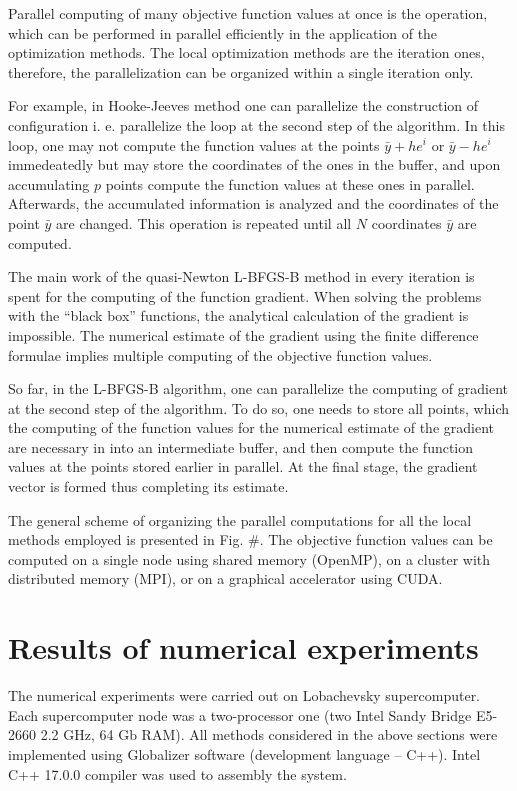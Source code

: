 \documentclass[runningheads]{llncs}
\begin{document}
Parallel computing of many objective function values at once is the operation, which can be performed in parallel efficiently in the application of the optimization methods. The local optimization methods are the iteration ones, therefore, the parallelization can be organized within a single iteration only.

For example, in Hooke-Jeeves method one can parallelize the construction of configuration i. e. parallelize the loop at the second step of the algorithm. In this loop, one may not compute the function values at the points $\bar{y} + he^i$ or $\bar{y} - he^i$ immedeatedly but may store the coordinates of the ones in the buffer, and upon accumulating $p$ points compute the function values at these ones in parallel. Afterwards, the accumulated information is analyzed and the coordinates of the point $\bar{y}$ are changed. This operation is repeated until all $N$ coordinates $\bar{y}$ are computed.

The main work of the quasi-Newton L-BFGS-B method in every iteration is spent for the computing of the function gradient. When solving the problems with the ``black box'' functions, the analytical calculation of the gradient is impossible. The numerical estimate of the gradient using the finite difference formulae implies multiple computing of the objective function values.

So far, in the L-BFGS-B algorithm, one can parallelize the computing of gradient at the second step of the algorithm. To do so, one needs to store all points, which the computing of the function values for the numerical estimate of the gradient are necessary in into an intermediate buffer, and then compute the function values at the points stored earlier in parallel. At the final stage, the gradient vector is formed thus completing its estimate.

The general scheme of organizing the parallel computations for all the local methods employed is presented in Fig. \#. The objective function values can be computed on a single node using shared memory (OpenMP), on a cluster with distributed memory (MPI), or on a graphical accelerator using CUDA.

\section{Results of numerical experiments}
The numerical experiments were carried out on Lobachevsky supercomputer. Each supercomputer node was a two-processor one (two Intel Sandy Bridge E5-2660 2.2 GHz, 64 Gb RAM). All methods considered in the above sections were implemented using Globalizer software \cite{globalizerSystem} (development language – C++). Intel C++ 17.0.0 compiler was used to assembly the system.
\end{document}
